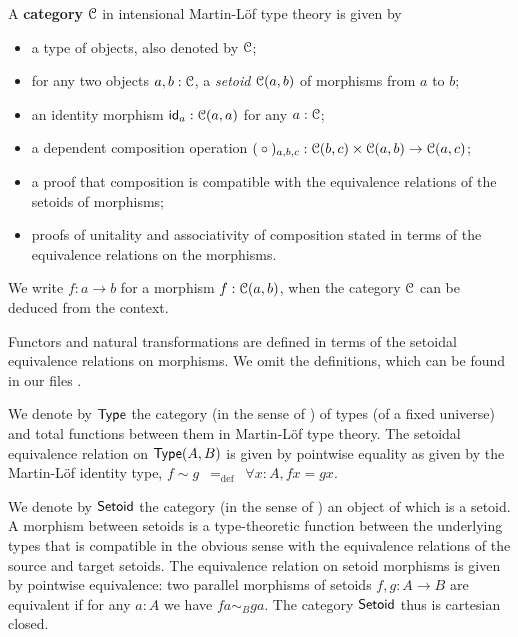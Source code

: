 \documentclass[a4paper,USenglish]{lipics}
\newcommand{\fat}[1]{\textbf{#1}}
\begin{document}
\begin{defn}
 \label{def:cat_imltt}
  A \fat{category} ${\mathcal{C}}$ in intensional Martin-Löf type theory  is given by
  \begin{itemize}
   \item a type of objects, also denoted by ${\mathcal{C}}$;
   \item for any two objects $a,b:{\mathcal{C}}$, a \emph{setoid} ${\mathcal{C}}(a,b)$ of morphisms from $a$ to $b$;
   \item an identity morphism $\mathsf{id}_a : {\mathcal{C}}(a,a)$ for any $a:{\mathcal{C}}$;
   \item a dependent composition operation $({} \circ {})_{a,b,c} : {\mathcal{C}}(b,c) \times {\mathcal{C}}(a,b) \to {\mathcal{C}}(a,c)$;
   \item a proof that composition is compatible with the equivalence relations of the setoids of morphisms;
   \item proofs of unitality and associativity of composition stated in terms of the equivalence relations on the morphisms.
  \end{itemize}
  We write $f:a\to b$ for a morphism $f : {\mathcal{C}}(a,b)$, when the category ${\mathcal{C}}$ can be deduced from the context.
\end{defn}

Functors and natural transformations are defined in terms of the setoidal equivalence relations on morphisms.
We omit the definitions, which can be found in our \coq files \parencite{trimat_coq}.

\begin{defn}
\label{def:set_setoid}
 We denote by $\mathsf{Type}$ the category (in the sense of ) of types (of a fixed universe) and total functions between them in Martin-L\"of type theory. 
 The setoidal equivalence relation on $\mathsf{Type}(A,B)$ is given by pointwise equality as given by the Martin-Löf identity type,
   $f \sim g \enspace =_{\text{def}} \enspace \forall x:A, fx = gx$.
 
 We denote by $\mathsf{Setoid}$ the category (in the sense of ) an object of which is a setoid.
 A morphism between setoids is a type-theoretic function between the underlying types that is compatible in the obvious sense with the equivalence relations of the source and target setoids.
 The equivalence relation on setoid morphisms is given by pointwise equivalence:
 two parallel morphisms of setoids $f,g:A\to B$ are equivalent if for any $a:A$ we have $fa \sim_B ga$.
 The category $\mathsf{Setoid}$ thus is cartesian closed.
 
\end{defn}
\end{document}

